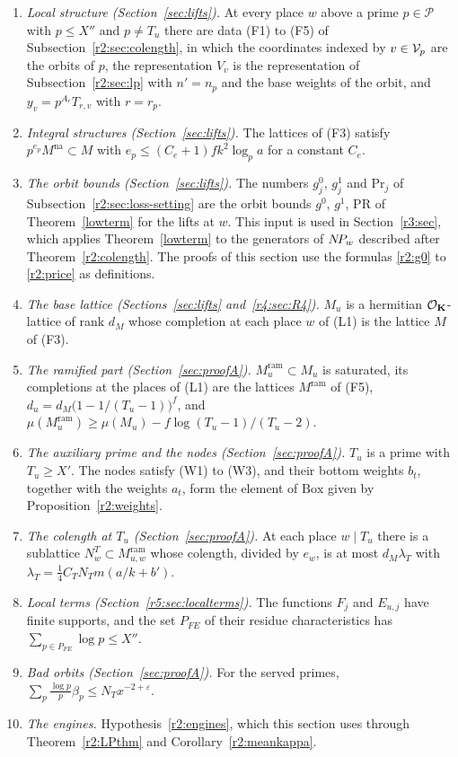 \begin{enumerate}
\item[(L1)] \emph{Local structure (Section~\ref{sec:lifts}).} At every place $w$ above a prime $p\in\mathcal P$ with $p\le X''$ and $p\ne T_u$ there are data (F1) to (F5) of Subsection~\ref{r2:sec:colength}, in which the coordinates indexed by $v\in\mathcal V_p$ are the orbits of $p$, the representation $V_v$ is the representation of Subsection~\ref{r2:sec:lp} with $n'=n_p$ and the base weights of the orbit, and $y_v=p^{A_r}T_{r,v}$ with $r=r_p$.
\item[(L2)] \emph{Integral structures (Section~\ref{sec:lifts}).} The lattices of (F3) satisfy $p^{e_p}M^{\mathrm{na}}\subset M$ with $e_p\le(C_e+1)fk^2\log_pa$ for a constant $C_e$.
\item[(L3)] \emph{The orbit bounds (Section~\ref{sec:lifts}).} The numbers $g^0_j$, $g^1_j$ and $\mathrm{Pr}_j$ of Subsection~\ref{r2:sec:loss-setting} are the orbit bounds $g^0$, $g^1$, $\mathrm{PR}$ of Theorem~\ref{lowterm} for the lifts at $w$. This input is used in Section~\ref{r3:sec}, which applies Theorem~\ref{lowterm} to the generators of $N\!P_w$ described after Theorem~\ref{r2:colength}. The proofs of this section use the formulas \eqref{r2:g0} to \eqref{r2:price} as definitions.
\item[(L4)] \emph{The base lattice (Sections~\ref{sec:lifts} and~\ref{r4:sec:R4}).} $M_u$ is a hermitian $\mathcal O_\mathbf K$-lattice of rank $d_M$ whose completion at each place $w$ of (L1) is the lattice $M$ of (F3).
\item[(L5)] \emph{The ramified part (Section~\ref{sec:proofA}).} $M^{\mathrm{ram}}_u\subset M_u$ is saturated, its completions at the places of (L1) are the lattices $M^{\mathrm{ram}}$ of (F5), $d_u=d_M\big(1-1/(T_u-1)\big)^f$, and $\mu(M^{\mathrm{ram}}_u)\ge\mu(M_u)-f\log(T_u-1)/(T_u-2)$.
\item[(L6)] \emph{The auxiliary prime and the nodes (Section~\ref{sec:proofA}).} $T_u$ is a prime with $T_u\ge X'$. The nodes satisfy (W1) to (W3), and their bottom weights $b_t$, together with the weights $a_t$, form the element of $\mathrm{Box}$ given by Proposition~\ref{r2:weights}.
\item[(L7)] \emph{The colength at $T_u$ (Section~\ref{sec:proofA}).} At each place $w\mid T_u$ there is a sublattice $N^T_w\subset M^{\mathrm{ram}}_{u,w}$ whose colength, divided by $e_w$, is at most $d_M\lambda_T$ with $\lambda_T=\frac14C_TN_Tm(a/k+b')$.
\item[(L8)] \emph{Local terms (Section~\ref{r5:sec:localterms}).} The functions $F_j$ and $E_{u,j}$ have finite supports, and the set $P_{FE}$ of their residue characteristics has $\sum_{p\in P_{FE}}\log p\le X''$.
\item[(L9)] \emph{Bad orbits (Section~\ref{sec:proofA}).} For the served primes, $\sum_p\frac{\log p}p\beta_p\le N_Tx^{-2+\varepsilon}$.
\item[(L10)] \emph{The engines.} Hypothesis~\ref{r2:engines}, which this section uses through Theorem~\ref{r2:LPthm} and Corollary~\ref{r2:meankappa}.
\end{enumerate}

